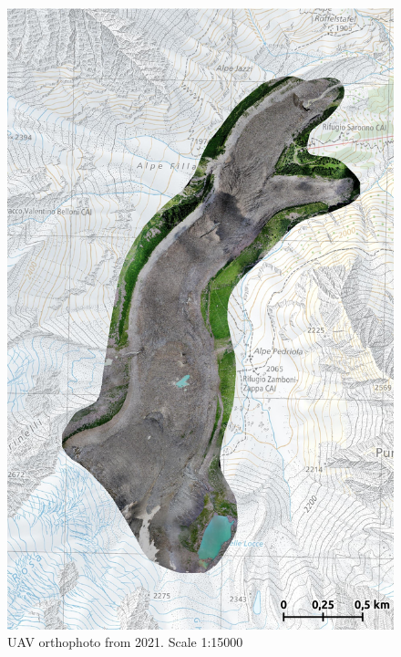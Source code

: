 \begin{figure}[p]
    \centering
    \includegraphics[width=\textwidth]{figures/appendix/orto_2021.jpg}
    \caption{UAV orthophoto from 2021. Scale 1:15000}
\end{figure}

